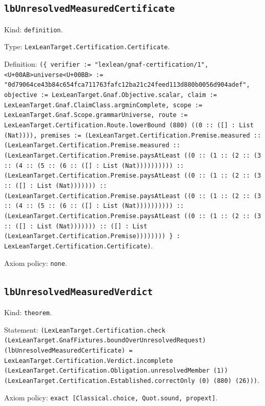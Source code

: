 \documentclass[11pt]{article}
\begin{document}
\subsection*{\texttt{lbUnresolvedMeasuredCertificate}}
\noindent Kind: \texttt{definition}.\par
\noindent Type: \texttt{LexLeanTarget.Certification.Certificate}.\par
\noindent Definition: \texttt{(\{ verifier := "lexlean/gnaf-certification/1", <U+00AB>universe<U+00BB> := "0d79064ce43b84c654fca711763fafc12ba21c24feed113d880b0056d904adef", objective := LexLeanTarget.Gnaf.Objective.scalar, claim := LexLeanTarget.Gnaf.ClaimClass.argminComplete, scope := LexLeanTarget.Gnaf.Scope.grammarUniverse, route := LexLeanTarget.Certification.Route.lowerBound (880) ((0 :: ([] : List (Nat)))), premises := (LexLeanTarget.Certification.Premise.measured :: (LexLeanTarget.Certification.Premise.measured :: (LexLeanTarget.Certification.Premise.paysAtLeast ((0 :: (1 :: (2 :: (3 :: (4 :: (5 :: (6 :: ([] : List (Nat)))))))))) :: (LexLeanTarget.Certification.Premise.paysAtLeast ((0 :: (1 :: (2 :: (3 :: ([] : List (Nat))))))) :: (LexLeanTarget.Certification.Premise.paysAtLeast ((0 :: (1 :: (2 :: (3 :: (4 :: (5 :: (6 :: ([] : List (Nat)))))))))) :: (LexLeanTarget.Certification.Premise.paysAtLeast ((0 :: (1 :: (2 :: (3 :: ([] : List (Nat))))))) :: ([] : List (LexLeanTarget.Certification.Premise)))))))) \} : LexLeanTarget.Certification.Certificate)}.\par
\noindent Axiom policy: \texttt{none}.\par
\subsection*{\texttt{lbUnresolvedMeasuredVerdict}}
\noindent Kind: \texttt{theorem}.\par
\noindent Statement: \texttt{(LexLeanTarget.Certification.check (LexLeanTarget.GnafFixtures.boundOverUnresolvedRequest) (lbUnresolvedMeasuredCertificate) = LexLeanTarget.Certification.Verdict.incomplete (LexLeanTarget.Certification.Obligation.unresolvedMember (1)) (LexLeanTarget.Certification.Established.correctOnly (0) (880) (26)))}.\par
\noindent Axiom policy: \texttt{exact [Classical.choice, Quot.sound, propext]}.\par
\end{document}
